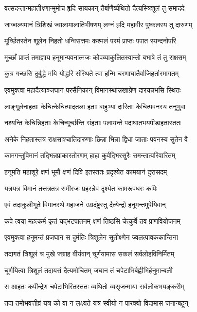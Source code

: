 \twolineshloka
{वत्सदन्तान्महातीक्ष्णान्मुमोच हृदि सायकान्}
{तैर्बाणैर्व्यथितो दैत्यस्त्रिशूलं तु समाददे}%

\twolineshloka
{जाज्वल्यमानं त्रिशिखं ज्वालामालातिभीषणम्}
{लग्नं हृदि महावीर पुष्कलस्य तु दारुणम्}%

\twolineshloka
{मूर्च्छितस्तेन शूलेन निहतो धन्विसत्तमः}
{कश्मलं परमं प्राप्तः पपात स्यन्दनोपरि}%

\twolineshloka
{मूर्च्छां प्राप्तं तमाज्ञाय हनूमान्पवनात्मजः}
{कोपव्याकुलितस्वान्तो बभाषे तं तु राक्षसम्}%

\twolineshloka
{कुत्र गच्छसि दुर्बुद्धे मयि योद्धरि संस्थिते}
{त्वां हन्मि चरणाघातैर्वाजिहर्तारमागतम्}%

\twolineshloka
{एवमुक्त्वा महादैत्याञ्जघान परसैनिकान्}
{विमानस्थान्नखाग्रेण दारयन्नभसि स्थितः}%

\twolineshloka
{लाङ्गूलेनाहताः केचित्केचित्पादतला हताः}
{बाहुभ्यां दारिताः केचित्पवनस्य तनूभुवा}%

\twolineshloka
{नश्यन्ति केचिन्निहताः केचिन्मूर्च्छन्ति संहताः}
{पलायन्ते पदाघातभयपीडाहतास्ततः}%

\twolineshloka
{अनेके निहतास्तत्र राक्षसाश्चातिदारुणाः}
{छिन्ना भिन्ना द्विधा जाताः पवनस्य सुतेन वै}%

\twolineshloka
{कामगन्तुविमानं तद्भिन्नप्राकारतोरणम्}
{हाहा कुर्वद्भिरसुरैः समन्तात्परिवारितम्}%

\twolineshloka
{हनूमति महाशूरे क्षणं भूमौ क्षणं दिवि}
{इतस्ततः प्रदृश्येत कामयानं दुरासदम्}%

\twolineshloka
{यत्रयत्र विमानं तत्तत्रतत्र समीरजः}
{प्रहरन्नेव दृश्येत कामरूपधरः कपिः}%

\twolineshloka
{एवं तदाकुलीभूते विमानस्थे महाजने}
{उग्रदंष्ट्रस्तु दैत्येन्द्रो हनूमन्तमुपेयिवान्}%

\twolineshloka
{कपे त्वया महत्कर्म कृतं यद्भटपातनम्}
{क्षणं तिष्ठसि चेत्कुर्वे तव प्राणवियोजनम्}%

\twolineshloka
{एवमुक्त्वा हनूमन्तं प्रजघान स दुर्मतिः}
{त्रिशूलेन सुतीक्ष्णेन ज्वलत्पावककान्तिना}%

\twolineshloka
{तदागतं त्रिशूलं च मुखे जग्राह वीर्यवान्}
{चूर्णयामास सकलं सर्वलोहविनिर्मितम्}%

\twolineshloka
{चूर्णयित्वा त्रिशूलं तदायसं दैत्यमोचितम्}
{जघान तं चपेटाभिर्बह्वीभिर्हनुमान्बली}%

\twolineshloka
{स आहतः कपीन्द्रेण चपेटाभिरितस्ततः}
{व्यथितो व्यसृजन्मायां सर्वलोकभयङ्करीम्}%

\twolineshloka
{तदा तमोभवत्तीव्रं यत्र को वा न लक्ष्यते}
{यत्र स्वीयो न पारक्यो विदामास जनान्बहून्}%

